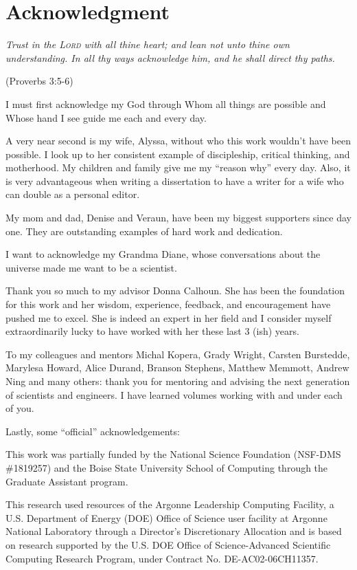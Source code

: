 \chapter*{Acknowledgment}

\begin{center}
{\em Trust in the \textsc{Lord} with all thine heart; and lean not unto thine own understanding. In all thy ways acknowledge him, and he shall direct thy paths.}

(Proverbs 3:5-6)
\end{center}

I must first acknowledge my God through Whom all things are possible and Whose hand I see guide me each and every day.

A very near second is my wife, Alyssa, without who this work wouldn't have been possible. I look up to her consistent example of discipleship, critical thinking, and motherhood. My children and family give me my ``reason why'' every day. Also, it is very advantageous when writing a dissertation to have a writer for a wife who can double as a personal editor.

My mom and dad, Denise and Veraun, have been my biggest supporters since day one. They are outstanding examples of hard work and dedication.

I want to acknowledge my Grandma Diane, whose conversations about the universe made me want to be a scientist.

Thank you so much to my advisor Donna Calhoun. She has been the foundation for this work and her wisdom, experience, feedback, and encouragement have pushed me to excel. She is indeed an expert in her field and I consider myself extraordinarily lucky to have worked with her these last 3 (ish) years.

To my colleagues and mentors Michal Kopera, Grady Wright, Carsten Burstedde, Marylesa Howard, Alice Durand, Branson Stephens, Matthew Memmott, Andrew Ning and many others: thank you for mentoring and advising the next generation of scientists and engineers. I have learned volumes working with and under each of you.

Lastly, some ``official'' acknowledgements:

This work was partially funded by the National Science Foundation (NSF-DMS \#1819257) and the Boise State University School of Computing through the Graduate Assistant program.

This research used resources of the Argonne Leadership Computing Facility, a U.S. Department of Energy (DOE) Office of Science user facility at Argonne National Laboratory through a Director's Discretionary Allocation and is based on research supported by the U.S. DOE Office of Science-Advanced Scientific Computing Research Program, under Contract No. DE-AC02-06CH11357.

